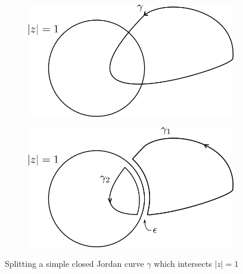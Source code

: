 \begin{solution}
    \vspace{1.0em}

    \begin{figure}[h]
        \centering
        \begin{subfigure}{0.45\textwidth}
            \includegraphics*[width=\textwidth]{problem_12_full_curve.png}
        \end{subfigure}
        \hspace{1.0em}
        \begin{subfigure}{0.45\textwidth}
            \includegraphics*[width=\textwidth]{problem_12_split_curve.png}
        \end{subfigure}
        \caption{Splitting a simple closed Jordan curve $\gamma$ which intersects $|z| = 1$}
        \label{fig:problem_12}
    \end{figure}

    \ \\
\end{solution}